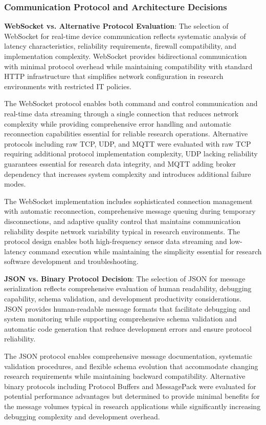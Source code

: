\documentclass[11pt,a4paper]{report}
\begin{document}
\subsubsection{Communication Protocol and Architecture Decisions}

\textbf{WebSocket vs. Alternative Protocol Evaluation}: The selection of WebSocket for real-time device communication
reflects systematic analysis of latency characteristics, reliability requirements, firewall compatibility, and
implementation complexity. WebSocket provides bidirectional communication with minimal protocol overhead while
maintaining compatibility with standard HTTP infrastructure that simplifies network configuration in research
environments with restricted IT policies.

The WebSocket protocol enables both command and control communication and real-time data streaming through a single
connection that reduces network complexity while providing comprehensive error handling and automatic reconnection
capabilities essential for reliable research operations. Alternative protocols including raw TCP, UDP, and MQTT were
evaluated with raw TCP requiring additional protocol implementation complexity, UDP lacking reliability guarantees
essential for research data integrity, and MQTT adding broker dependency that increases system complexity and introduces
additional failure modes.

The WebSocket implementation includes sophisticated connection management with automatic reconnection, comprehensive
message queuing during temporary disconnections, and adaptive quality control that maintains communication reliability
despite network variability typical in research environments. The protocol design enables both high-frequency sensor
data streaming and low-latency command execution while maintaining the simplicity essential for research software
development and troubleshooting.

\textbf{JSON vs. Binary Protocol Decision}: The selection of JSON for message serialization reflects comprehensive evaluation
of human readability, debugging capability, schema validation, and development productivity considerations. JSON
provides human-readable message formats that facilitate debugging and system monitoring while supporting comprehensive
schema validation and automatic code generation that reduce development errors and ensure protocol reliability.

The JSON protocol enables comprehensive message documentation, systematic validation procedures, and flexible schema
evolution that accommodate changing research requirements while maintaining backward compatibility. Alternative binary
protocols including Protocol Buffers and MessagePack were evaluated for potential performance advantages but determined
to provide minimal benefits for the message volumes typical in research applications while significantly increasing
debugging complexity and development overhead.
\end{document}

